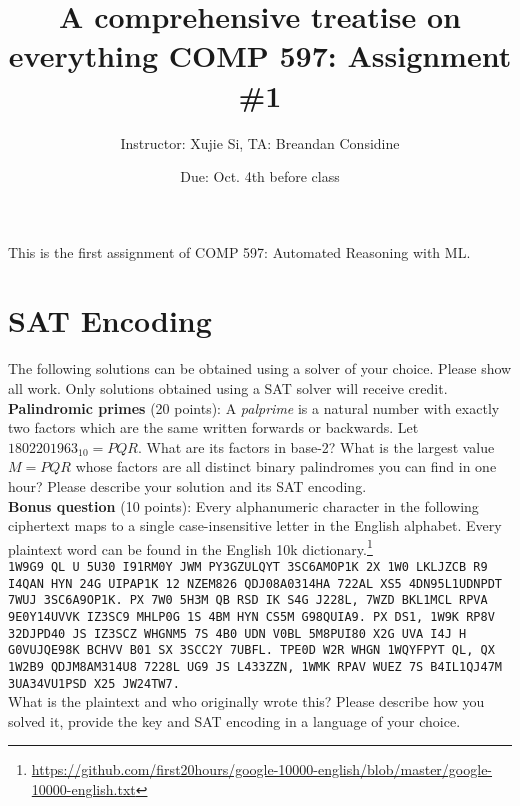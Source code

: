 \documentclass[11pt]{article}
\author{Instructor: Xujie Si, TA: Breandan Considine}
\date{Due: Oct. 4th before class}
\title{A comprehensive treatise on everything\vspace{-2ex}%
}
\title{COMP 597: Assignment \#1}
\begin{document}
    \maketitle
    \noindent This is the first assignment of COMP 597: Automated Reasoning with ML.


    \section{SAT Encoding}

    The following solutions can be obtained using a solver of your choice. Please show all work. Only solutions obtained using a SAT solver will receive credit.\\

    \noindent \textbf{Palindromic primes} (20 points): A \textit{palprime} is a natural number with exactly two factors which are the same written forwards or backwards. Let $1802201963_{10} = PQR$. What are its factors in base-2? What is the largest value $M=PQR$ whose factors are all distinct binary palindromes you can find in one hour? Please describe your solution and its SAT encoding.\\

    \noindent \textbf{Bonus question} (10 points): Every alphanumeric character in the following ciphertext maps to a single case-insensitive letter in the English alphabet. Every plaintext word can be found in the English 10k dictionary.\footnote{\url{https://github.com/first20hours/google-10000-english/blob/master/google-10000-english.txt}}\\

    \noindent \tiny\texttt{1W9G9 QL U 5U30 I91RM0Y JWM PY3GZULQYT 3SC6AMOP1K 2X 1W0 LKLJZCB R9 I4QAN HYN 24G UIPAP1K 12 NZEM826 QDJ08A0314HA 722AL XS5 4DN95L1UDNPDT 7WUJ 3SC6A9OP1K. PX 7W0 5H3M QB RSD IK S4G J228L, 7WZD BKL1MCL RPVA 9E0Y14UVVK IZ3SC9 MHLP0G 1S 4BM HYN CS5M G98QUIA9. PX DS1, 1W9K RP8V 32DJPD40 JS IZ3SCZ WHGNM5 7S 4B0 UDN V0BL 5M8PUI80 X2G UVA I4J H G0VUJQE98K BCHVV B01 SX 3SCC2Y 7UBFL. TPE0D W2R WHGN 1WQYFPYT QL, QX 1W2B9 QDJM8AM314U8 7228L UG9 JS L433ZZN, 1WMK RPAV WUEZ 7S B4IL1QJ47M 3UA34VU1PSD X25 JW24TW7.}\normalsize\\

    \noindent What is the plaintext and who originally wrote this? Please describe how you solved it, provide the key and SAT encoding in a language of your choice.
\end{document}

